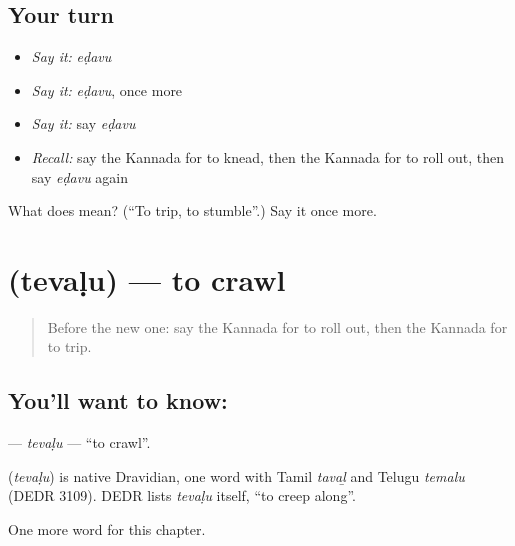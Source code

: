 \subsection*{Your turn}
\begin{itemize}
\raggedright
  \item \emph{Say it:} \emph{eḍavu}
  \item \emph{Say it:} \emph{eḍavu}, once more
  \item \emph{Say it:} say \emph{eḍavu}
  \item \emph{Recall:} say the Kannada for to knead, then the Kannada for to roll out, then say \emph{eḍavu} again
\end{itemize}

\begin{tcolorbox}[breakable,colback=teal!4,colframe=teal!35!black,title={Before you move on}]
What does  mean? (\textquotedblleft{}To trip, to stumble\textquotedblright{}.) Say it once more.
\end{tcolorbox}
\section[\texorpdfstring{\kn{ತೆವಳು} (tevaḷu)}{ತೆವಳು (tevaḷu)}]{ (tevaḷu) — to crawl}

\label{lesson:KA-C206-tevalu}



\begin{quote}
Before the new one: say the Kannada for to roll out, then the Kannada for to trip.
\end{quote}

\subsection*{You'll want to know: }
\textbf{} — \emph{tevaḷu} — \textquotedblleft{}to crawl\textquotedblright{}.

\begin{cousinweb}
\textbf{} (\emph{tevaḷu}) is native Dravidian, one word with Tamil \emph{tavaḻ} and Telugu \emph{temalu} (DEDR 3109). DEDR lists \emph{tevaḷu} itself, \textquotedblleft{}to creep along\textquotedblright{}.
\end{cousinweb}

\begin{grammarlens}[title={What you've built}]
One more word for this chapter.
\end{grammarlens}

